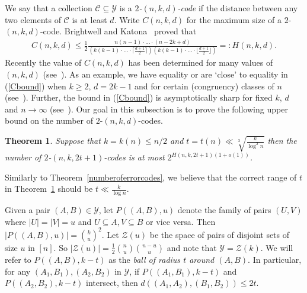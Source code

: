 \documentclass[11pt]{article}
\newtheorem{theorem}{Theorem}[section]
\numberwithin{equation}{section}
\def\eps{\varepsilon}
\begin{document}
We say that a collection $\mathcal C \subseteq \mathcal Y$ is a \emph{$2$-$(n,k,d)$-code} if the distance between any two elements of $\mathcal C$ is at least $d$.
Write $C(n,k,d)$ for the maximum size of a $2$-$(n,k,d)$-code. Brightwell and Katona~\cite{bright} proved that
\begin{align}\label{Cbound}
C(n,k,d)\leq \frac{1}{2}\frac{n(n-1)\cdot \ldots\cdot (n-2k+d)}{\left ( k(k-1)\cdot\ldots\cdot \lceil \frac{d+1}{2}\rceil \right ) \left ( k(k-1)\cdot\ldots\cdot \lfloor \frac{d+1}{2}\rfloor\right )}=:H(n,k,d).
\end{align}
Recently the value of $C(n,k,d)$ has been determined for many values of $(n,k,d)$ (see~\cite{bollobastransport, chee}). As an example, we have equality or are `close' to equality in (\ref{Cbound}) when $k \geq 2$, $d =2k-1$ and  for certain (congruency) classes of $n$ (see~\cite{chee}). Further, the  bound in (\ref{Cbound}) is asymptotically sharp for fixed $k$, $d$ and $n \rightarrow \infty$ (see~\cite{bollobastransport}).
Our goal in this subsection is to prove the following  upper bound on the number of $2$-$(n,k,d)$-codes.

\begin{theorem}\label{numberoftransportcodes}
Suppose that $k=k(n)\leq n/2$ and  $t=t(n)\ll\sqrt[3]{\frac{k}{\log^2 n}}$ then the number of $2$-$(n,k,2t+1)$-codes is  at most $2^{H(n,k,2t+1)(1+o(1))}$.
\end{theorem}
Similarly to Theorem~\ref{numberoferrorcodes}, we believe that the correct range of $t$ in Theorem~\ref{numberoftransportcodes} should be $t\ll\frac{k}{\log n}$.%


Given a pair $(A,B) \in \mathcal Y$, let $P((A,B),u)$ denote the family of pairs $(U,V )$ where $|U| =|V | = u$ and $U \subseteq A, V \subseteq B$ or vice versa. Then $|P((A,B),u)|=\binom{k}{u}^2$. Let $\mathcal{Z}(u)$ be the space of pairs of disjoint sets of size $u$ in $[n]$. So $|\mathcal{Z}(u)|=\frac12\binom{n}{u}\binom{n-u}{u}$ and note that $\mathcal Y=\mathcal Z(k)$.  We will refer to  $P((A,B),k-t)$ as the \emph{ball of radius $t$ around $(A,B)$}. In particular,  for any $(A_1,B_1),(A_2,B_2)$ in $\mathcal{Y}$, if $P((A_1,B_1),k-t)$ and $P((A_2,B_2),k-t)$ intersect, then $d((A_1,A_2),(B_1,B_2))\leq 2t.$
\end{document}

